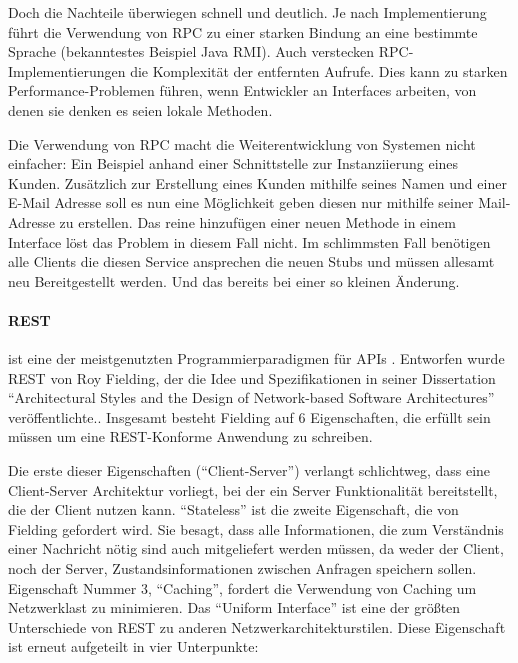 \documentclass[12pt,a4paper,bibliography=totocnumbered,listof=totocnumbered]{scrartcl}
\begin{document}

Doch die Nachteile überwiegen schnell und deutlich. Je nach Implementierung führt die Verwendung von RPC zu einer starken Bindung an eine bestimmte Sprache (bekanntestes Beispiel Java RMI). Auch verstecken RPC-Implementierungen die Komplexität der entfernten Aufrufe. Dies kann zu starken Performance-Problemen führen, wenn Entwickler an Interfaces arbeiten, von denen sie denken es seien lokale Methoden\cite[S.93]{buildingms}.

Die Verwendung von RPC macht die Weiterentwicklung von Systemen nicht einfacher: Ein Beispiel anhand einer Schnittstelle zur Instanziierung eines Kunden. Zusätzlich zur Erstellung eines Kunden mithilfe seines Namen und einer E-Mail Adresse soll es nun eine Möglichkeit geben diesen nur mithilfe seiner Mail-Adresse zu erstellen. Das reine hinzufügen einer neuen Methode in einem Interface löst das Problem in diesem Fall nicht. Im schlimmsten Fall benötigen alle Clients die diesen Service ansprechen die neuen Stubs und müssen allesamt neu Bereitgestellt werden\cite[S.94]{buildingms}. Und das bereits bei einer so kleinen Änderung.

\paragraph{\acf{REST}} ist eine der meistgenutzten Programmierparadigmen für \acp{API} \cite{duvander}. Entworfen wurde \ac{REST} von Roy Fielding, der die Idee und Spezifikationen in seiner Dissertation \enquote{Architectural Styles and the Design of Network-based Software Architectures} veröffentlichte.\cite{fielding}. Insgesamt besteht Fielding auf 6 Eigenschaften, die erfüllt sein müssen um eine REST-Konforme Anwendung zu schreiben.

Die erste dieser Eigenschaften (\enquote{Client-Server}) verlangt schlichtweg, dass eine Client-Server Architektur vorliegt, bei der ein Server Funktionalität bereitstellt, die der Client nutzen kann.
\enquote{Stateless} ist die zweite Eigenschaft, die von Fielding gefordert wird. Sie besagt, dass alle Informationen, die zum Verständnis einer Nachricht nötig sind auch mitgeliefert werden müssen, da weder der Client, noch der Server, Zustandsinformationen zwischen Anfragen speichern sollen.
Eigenschaft Nummer 3, \enquote{Caching}, fordert die Verwendung von Caching um Netzwerklast zu minimieren.
Das \enquote{Uniform Interface} ist eine der größten Unterschiede von REST zu anderen Netzwerkarchitekturstilen. Diese Eigenschaft ist erneut aufgeteilt in vier Unterpunkte:
\end{document}
